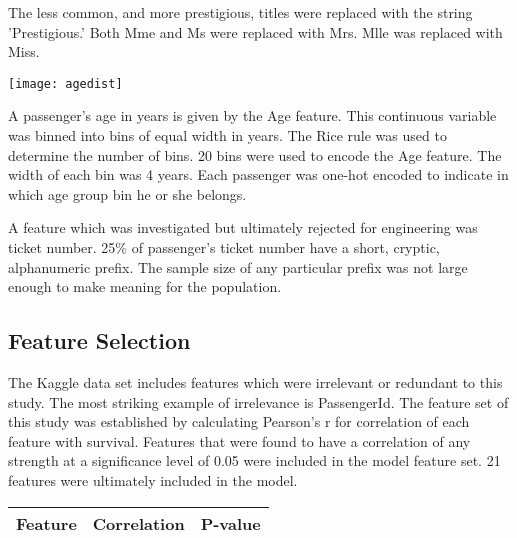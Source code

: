 \documentclass[10pt]{article}
\begin{document}
\begin{multicols}{2}
	The less common, and more prestigious, titles were replaced with the string 'Prestigious.'
	Both Mme and Ms were replaced with Mrs.
	Mlle was replaced with Miss.
	\begin{center}
	\texttt{[image: agedist]}
	\end{center}

	A passenger's age in years is given by the Age feature.
	This continuous variable was binned into bins of equal width in years.
	The Rice rule was used to determine the number of bins.
	20 bins were used to encode the Age feature.
	The width of each bin was 4 years.
	Each passenger was one-hot encoded to indicate in which age group bin he or she belongs.

	A feature which was investigated but ultimately rejected for engineering was ticket number.
	25\% of passenger's ticket number have a short, cryptic, alphanumeric prefix.
	The sample size of any particular prefix was not large enough to make meaning for the population.

\subsection{Feature Selection}
	
	The Kaggle data set includes features which were irrelevant or redundant to this study.
	The most striking example of irrelevance is PassengerId.
	The feature set of this study was established by calculating Pearson's r for correlation of each feature with survival.
	Features that were found to have a correlation of any strength at a significance level of 0.05 were included in the model feature set.
	21 features were ultimately included in the model.

	\begin{tabular}{l l l}
		Feature & Correlation & P-value \\
		\hline


\end{tabular}
\end{multicols}
\end{document}
